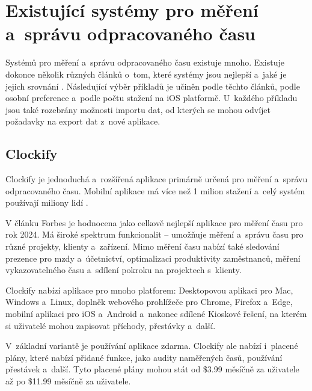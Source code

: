 \section{Existující systémy pro měření a~správu odpracovaného času}\label{existing-tracking-solutions}

Systémů pro měření a~správu odpracovaného času existuje mnoho. Existuje dokonce několik různých článků o~tom, které systémy jsou nejlepší a~jaké je jejich srovnání \cite{forbes-tracking-apps-article} \cite{zapier-tracking-apps-article}. Následující výběr příkladů je učiněn podle těchto článků, podle osobní preference a~podle počtu stažení na iOS platformě. U~každého příkladu jsou také rozebrány možnosti importu dat, od kterých se mohou odvíjet požadavky na export dat z~nové aplikace.

\subsection{Clockify}

Clockify je jednoduchá a~rozšířená aplikace primárně určená pro měření a~správu odpracovaného času. Mobilní aplikace má více než 1 milion stažení \cite{clockify-app-magic} a~celý systém používají miliony lidí \cite{clockify-customers}. 

V článku Forbes je hodnocena jako celkově nejlepší aplikace pro měření času pro rok 2024. Má široké spektrum funkcionalit – umožňuje měření a~správu času pro různé projekty, klienty a~zařízení. Mimo měření času nabízí také sledování prezence pro mzdy a~účetnictví, optimalizaci produktivity zaměstnanců, měření vykazovatelného času a~sdílení pokroku na projektech s~klienty. \cite{forbes-tracking-apps-article}

Clockify nabízí aplikace pro mnoho platforem: Desktopovou aplikaci pro Mac, Windows a~Linux, doplněk webového prohlížeče pro Chrome, Firefox a~Edge, mobilní aplikaci pro iOS a~Android a~nakonec sdílené Kioskové řešení, na kterém si uživatelé mohou zapisovat příchody, přestávky a~další. \cite{clockify-apps}

V~základní variantě je používání aplikace zdarma. Clockify ale nabízí i~placené plány, které nabízí přidané funkce, jako audity naměřených časů, používání přestávek a~další. Tyto placené plány mohou stát od \$3.99 měsíčně za uživatele až po \$11.99 měsíčně za uživatele. \cite{clockify-pricing} 


